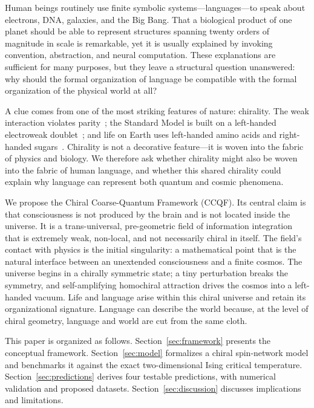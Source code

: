 \documentclass[twocolumn,11pt,a4paper]{article}
\begin{document}
Human beings routinely use finite symbolic systems---languages---to speak about electrons, DNA, galaxies, and the Big Bang. That a biological product of one planet should be able to represent structures spanning twenty orders of magnitude in scale is remarkable, yet it is usually explained by invoking convention, abstraction, and neural computation. These explanations are sufficient for many purposes, but they leave a structural question unanswered: why should the formal organization of language be compatible with the formal organization of the physical world at all?

A clue comes from one of the most striking features of nature: chirality. The weak interaction violates parity~\cite{lee1956, wu1957}; the Standard Model is built on a left-handed electroweak doublet~\cite{glashow1970, weinberg1967}; and life on Earth uses left-handed amino acids and right-handed sugars~\cite{vester1959, soai1995}. Chirality is not a decorative feature---it is woven into the fabric of physics and biology. We therefore ask whether chirality might also be woven into the fabric of human language, and whether this shared chirality could explain why language can represent both quantum and cosmic phenomena.

We propose the Chiral Coarse-Quantum Framework (CCQF). Its central claim is that consciousness is not produced by the brain and is not located inside the universe. It is a trans-universal, pre-geometric field of information integration that is extremely weak, non-local, and not necessarily chiral in itself. The field's contact with physics is the initial singularity: a mathematical point that is the natural interface between an unextended consciousness and a finite cosmos. The universe begins in a chirally symmetric state; a tiny perturbation breaks the symmetry, and self-amplifying homochiral attraction drives the cosmos into a left-handed vacuum. Life and language arise within this chiral universe and retain its organizational signature. Language can describe the world because, at the level of chiral geometry, language and world are cut from the same cloth.

This paper is organized as follows. Section~\ref{sec:framework} presents the conceptual framework. Section~\ref{sec:model} formalizes a chiral spin-network model and benchmarks it against the exact two-dimensional Ising critical temperature. Section~\ref{sec:predictions} derives four testable predictions, with numerical validation and proposed datasets. Section~\ref{sec:discussion} discusses implications and limitations.
\end{document}
